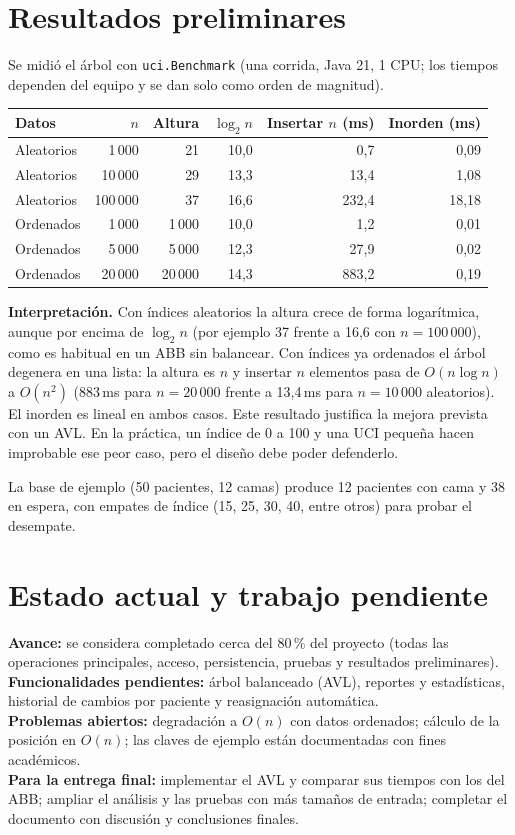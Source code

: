 \documentclass[11pt,a4paper]{article}
\begin{document}
\section{Resultados preliminares}\label{sec:res}
Se midió el árbol con \texttt{uci.Benchmark} (una corrida, Java 21, 1 CPU; los tiempos dependen del equipo y se dan solo como orden de magnitud).
\begin{center}
\begin{tabular}{@{}lrrrrr@{}}
\toprule \textbf{Datos} & $n$ & \textbf{Altura} & $\log_2 n$ & \textbf{Insertar $n$ (ms)} & \textbf{Inorden (ms)}\\ \midrule
Aleatorios & 1\,000 & 21 & 10,0 & 0,7 & 0,09\\
Aleatorios & 10\,000 & 29 & 13,3 & 13,4 & 1,08\\
Aleatorios & 100\,000 & 37 & 16,6 & 232,4 & 18,18\\
Ordenados & 1\,000 & 1\,000 & 10,0 & 1,2 & 0,01\\
Ordenados & 5\,000 & 5\,000 & 12,3 & 27,9 & 0,02\\
Ordenados & 20\,000 & 20\,000 & 14,3 & 883,2 & 0,19\\
\bottomrule
\end{tabular}
\end{center}
\textbf{Interpretación.} Con índices aleatorios la altura crece de forma logarítmica, aunque por encima de $\log_2 n$ (por ejemplo 37 frente a 16,6 con $n=100\,000$), como es habitual en un ABB sin balancear. Con índices ya ordenados el árbol degenera en una lista: la altura es $n$ y insertar $n$ elementos pasa de $O(n\log n)$ a $O(n^2)$ (883\,ms para $n=20\,000$ frente a 13,4\,ms para $n=10\,000$ aleatorios). El inorden es lineal en ambos casos. Este resultado justifica la mejora prevista con un AVL. En la práctica, un índice de 0 a 100 y una UCI pequeña hacen improbable ese peor caso, pero el diseño debe poder defenderlo.

La base de ejemplo (50 pacientes, 12 camas) produce 12 pacientes con cama y 38 en espera, con empates de índice (15, 25, 30, 40, entre otros) para probar el desempate.

\section{Estado actual y trabajo pendiente}
\textbf{Avance:} se considera completado cerca del 80\,\% del proyecto (todas las operaciones principales, acceso, persistencia, pruebas y resultados preliminares).\\
\textbf{Funcionalidades pendientes:} árbol balanceado (AVL), reportes y estadísticas, historial de cambios por paciente y reasignación automática.\\
\textbf{Problemas abiertos:} degradación a $O(n)$ con datos ordenados; cálculo de la posición en $O(n)$; las claves de ejemplo están documentadas con fines académicos.\\
\textbf{Para la entrega final:} implementar el AVL y comparar sus tiempos con los del ABB; ampliar el análisis y las pruebas con más tamaños de entrada; completar el documento con discusión y conclusiones finales.
\end{document}
